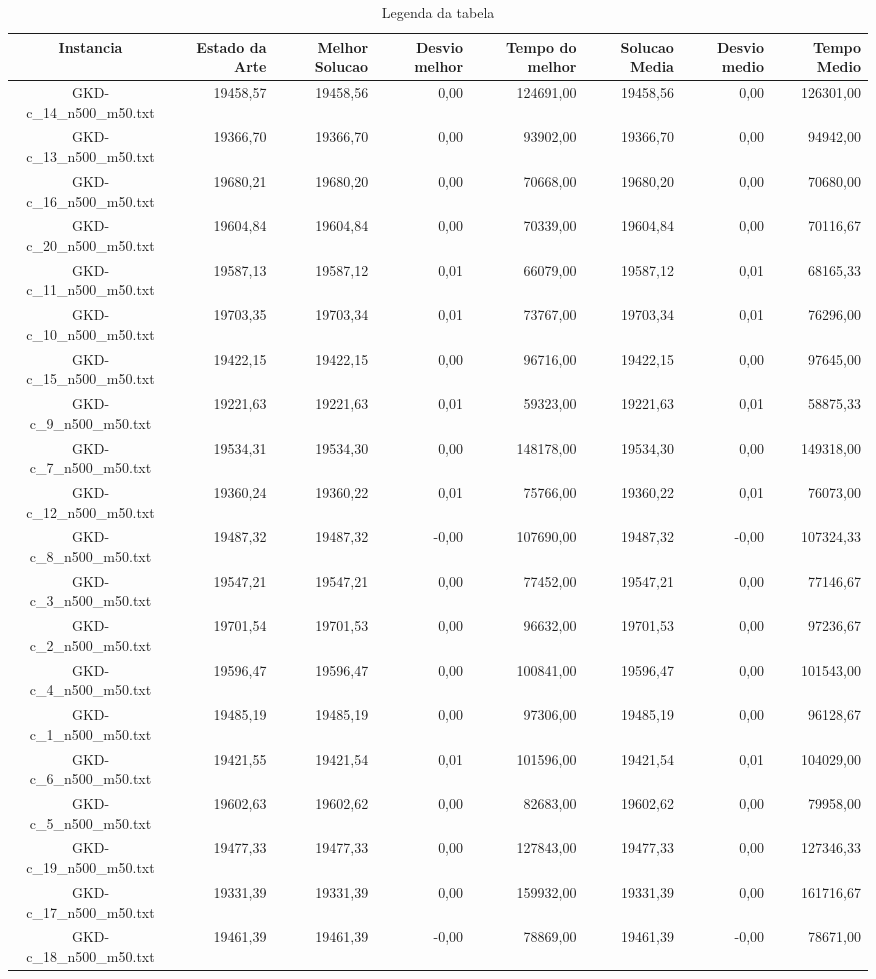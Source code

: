 \begin{landscape}
	\begin{table}[ht]
	\centering
	\begin{tabular}{| c | r | r | r | r | r | r | r |  }
\hline
Instancia&Estado da Arte&Melhor Solucao&Desvio melhor&Tempo do melhor&Solucao Media&Desvio medio&Tempo Medio\\ \hline 
		GKD-c\_14\_n500\_m50.txt&19458,57&19458,56&0,00&124691,00&19458,56&0,00&126301,00\\
		GKD-c\_13\_n500\_m50.txt&19366,70&19366,70&0,00&93902,00&19366,70&0,00&94942,00\\
		GKD-c\_16\_n500\_m50.txt&19680,21&19680,20&0,00&70668,00&19680,20&0,00&70680,00\\
		GKD-c\_20\_n500\_m50.txt&19604,84&19604,84&0,00&70339,00&19604,84&0,00&70116,67\\
		GKD-c\_11\_n500\_m50.txt&19587,13&19587,12&0,01&66079,00&19587,12&0,01&68165,33\\
		GKD-c\_10\_n500\_m50.txt&19703,35&19703,34&0,01&73767,00&19703,34&0,01&76296,00\\
		GKD-c\_15\_n500\_m50.txt&19422,15&19422,15&0,00&96716,00&19422,15&0,00&97645,00\\
		GKD-c\_9\_n500\_m50.txt&19221,63&19221,63&0,01&59323,00&19221,63&0,01&58875,33\\
		GKD-c\_7\_n500\_m50.txt&19534,31&19534,30&0,00&148178,00&19534,30&0,00&149318,00\\
		GKD-c\_12\_n500\_m50.txt&19360,24&19360,22&0,01&75766,00&19360,22&0,01&76073,00\\
		GKD-c\_8\_n500\_m50.txt&19487,32&19487,32&-0,00&107690,00&19487,32&-0,00&107324,33\\
		GKD-c\_3\_n500\_m50.txt&19547,21&19547,21&0,00&77452,00&19547,21&0,00&77146,67\\
		GKD-c\_2\_n500\_m50.txt&19701,54&19701,53&0,00&96632,00&19701,53&0,00&97236,67\\
		GKD-c\_4\_n500\_m50.txt&19596,47&19596,47&0,00&100841,00&19596,47&0,00&101543,00\\
		GKD-c\_1\_n500\_m50.txt&19485,19&19485,19&0,00&97306,00&19485,19&0,00&96128,67\\
		GKD-c\_6\_n500\_m50.txt&19421,55&19421,54&0,01&101596,00&19421,54&0,01&104029,00\\
		GKD-c\_5\_n500\_m50.txt&19602,63&19602,62&0,00&82683,00&19602,62&0,00&79958,00\\
		GKD-c\_19\_n500\_m50.txt&19477,33&19477,33&0,00&127843,00&19477,33&0,00&127346,33\\
		GKD-c\_17\_n500\_m50.txt&19331,39&19331,39&0,00&159932,00&19331,39&0,00&161716,67\\
		GKD-c\_18\_n500\_m50.txt&19461,39&19461,39&-0,00&78869,00&19461,39&-0,00&78671,00\\
\hline
	\end{tabular}
	\caption{Legenda da tabela}
	\label{seu_label}
	\end{table}
\end{landscape}

